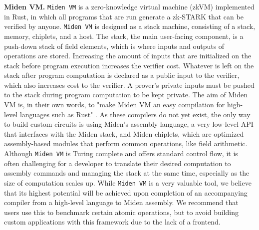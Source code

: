 \textbf{Miden VM.}
\texttt{Miden VM} \cite{PolygonMiden2023MidenVM} is a zero-knowledge virtual machine (zkVM) implemented in Rust, in which all programs that are run generate a zk-STARK that can be verified by anyone.
\texttt{Miden VM} is designed as a stack machine, consisting of a stack, memory, chiplets, and a host. The stack, the main user-facing component, is a push-down stack of field elements, which is where inputs and outputs of operations are stored. Increasing the amount of inputs that are initialized on the stack before program execution increases the verifier cost. Whatever is left on the stack after program computation is declared as a public input to the verifier, which also increases cost to the verifier. A prover's private inputs must be pushed to the stack during program computation to be kept private.
The aim of Miden VM is, in their own words, to "make Miden VM an easy compilation for high-level languages such as Rust" \cite{PolygonMiden2023VMOverview}. As these compilers do not yet exist, the only way to build custom circuits is using Miden's assembly language, a very low-level API that interfaces with the Miden stack, and Miden chiplets, which are optimized assembly-based modules that perform common operations, like field arithmetic. Although \texttt{Miden VM} is Turing complete and offers standard control flow, it is often challenging for a developer to translate their desired computation to assembly commands and managing the stack at the same time, especially as the size of computation scales up. While \texttt{Miden VM} is a very valuable tool, we believe that its highest potential will be achieved upon completion of an accompanying compiler from a high-level language to Miden assembly. We recommend that users use this to benchmark certain atomic operations, but to avoid building custom applications with this framework due to the lack of a frontend.


